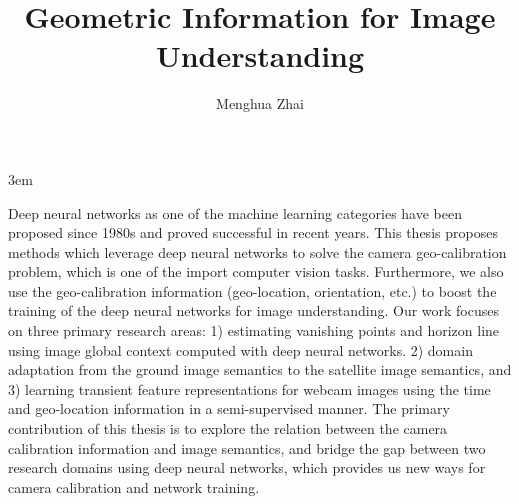 \documentclass[final]{ukthesis}
\begin{document}
\emergencystretch 3em

\author{Menghua Zhai}
\title{Geometric Information for Image Understanding}

\abstract
{
  \SingleSpacing
    Deep neural networks as one of the machine learning categories have been proposed
    since 1980s and proved successful in recent years. This thesis proposes methods which
    leverage deep neural networks to solve the camera geo-calibration problem, which is
    one of the import computer vision tasks. Furthermore, we also use the geo-calibration
    information (geo-location, orientation, etc.) to boost the training of the deep neural
    networks for image understanding.
    Our work focuses on three primary research areas: 1) estimating vanishing points
    and horizon line using image global context computed with deep neural networks. 2)
    domain adaptation from the ground image semantics to the satellite image semantics,
    and 3) learning transient feature representations for webcam images using the time
    and geo-location information in a semi-supervised manner.
    The primary contribution of this thesis is to explore the relation between the
    camera calibration information and image semantics, and bridge the gap between
    two research domains using deep neural networks, which provides us new ways for
    camera calibration and network training.
}


\frontmatter
\maketitle



\tableofcontents\clearpage

\mainmatter


\backmatter




\end{document}
